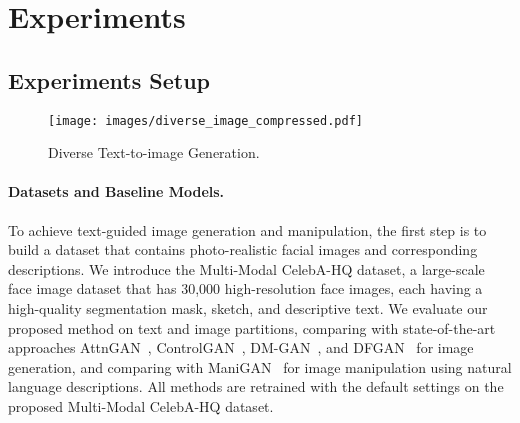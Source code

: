 \documentclass[final]{cvpr}
\begin{document}
\section{Experiments}
\label{sec:experiments}

\subsection{Experiments Setup}
\label{subsec:setup}

\begin{figure}[th]
\texttt{[image: images/diverse\_image\_compressed.pdf]}
\centering
\caption{Diverse Text-to-image Generation.}
\label{fig:diverse_image}
\end{figure}

\begin{table}[th]
\centering
\caption{{Quantitative Comparison of Text-to-Image Generation.} We use FID, LPIPS, accuracy (Acc.), and realism (Real.) to compare the state of the art and our method on the proposed Multi-modal CelebA-HQ dataset. $\downarrow$ means the lower the better while $\uparrow$ means the opposite.}
\label{tab:quan_gen}
\end{table}

\paragraph{Datasets and Baseline Models.}
To achieve text-guided image generation and manipulation, the first step is to build a dataset that contains photo-realistic facial images and corresponding descriptions. 
We introduce the Multi-Modal CelebA-HQ dataset, a large-scale face image dataset that has 30,000 high-resolution face images, each having a high-quality segmentation mask, sketch, and descriptive text. 
We evaluate our proposed method on text and image partitions, comparing with state-of-the-art approaches AttnGAN~\cite{xu2018attngan}, ControlGAN~\cite{li2019control}, DM-GAN~\cite{zhu2019dmgan}, and DFGAN~\cite{tao2020dfgan} for image generation, and comparing with ManiGAN~\cite{li2020manigan} for image manipulation using natural language descriptions. 
All methods are retrained with the default settings on the proposed Multi-Modal CelebA-HQ dataset.
\end{document}
